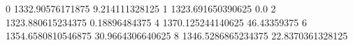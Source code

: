 0 1332.90576171875 9.214111328125
1 1323.691650390625 0.0
2 1323.880615234375 0.18896484375
4 1370.125244140625 46.43359375
6 1354.6580810546875 30.9664306640625
8 1346.5286865234375 22.8370361328125
